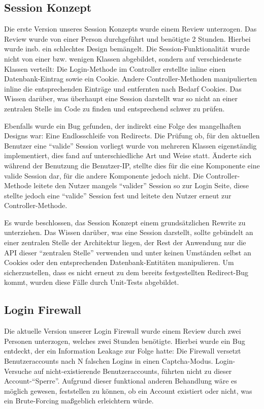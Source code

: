 \documentclass[12pt,DIV14,BCOR10mm,a4paper,twoside,parskip=half-,headsepline,headinclude,english,ngerman,bibliography=totocnumbered]{scrreprt}
\begin{document}
\subsection{Session Konzept}
Die erste Version unseres Session Konzepts wurde einem Review unterzogen. Das Review wurde von einer Person durchgeführt und benötigte 2 Stunden. Hierbei wurde insb. ein schlechtes Design bemängelt. Die Session-Funktionalität wurde nicht von einer bzw. wenigen Klassen abgebildet, sondern auf verschiedenste Klassen verteilt: Die Login-Methode im Controller erstellte inline einen Datenbank-Eintrag sowie ein Cookie. Andere Controller-Methoden manipulierten inline die entsprechenden Einträge und entfernten nach Bedarf Cookies. Das Wissen darüber, was überhaupt eine Session darstellt war so nicht an einer zentralen Stelle im Code zu finden und entsprechend schwer zu prüfen.

Ebenfalls wurde ein Bug gefunden, der indirekt eine Folge des mangelhaften Designs war: Eine Endlosschleife von Redirects. Die Prüfung ob, für den aktuellen Benutzer eine ``valide'' Session vorliegt wurde von mehreren Klassen eigenständig implementiert, dies fand auf unterschiedliche Art und Weise statt. Änderte sich während der Benutzung die Benutzer-IP, stellte dies für die eine Komponente eine valide Session dar, für die andere Komponente jedoch nicht. Die Controller-Methode leitete den Nutzer mangels ``valider'' Session so zur Login Seite, diese stellte jedoch eine ``valide'' Session fest und leitete den Nutzer erneut zur Controller-Methode.

Es wurde beschlossen, das Session Konzept einem grundsätzlichen Rewrite zu unterziehen. Das Wissen darüber, was eine Session darstellt, sollte gebündelt an einer zentralen Stelle der Architektur liegen, der Rest der Anwendung nur die API dieser ``zentralen Stelle'' verwenden und unter keinen Umständen selbst an Cookies oder den entsprechenden Datenbank-Entitäten manipulieren. Um sicherzustellen, dass es nicht erneut zu dem bereits festgestellten Redirect-Bug kommt, wurden diese Fälle durch Unit-Tests abgebildet.

\subsection{Login Firewall}
Die aktuelle Version unserer Login Firewall wurde einem Review durch zwei Personen unterzogen, welches zwei Stunden benötigte. Hierbei wurde ein Bug entdeckt, der ein Information Leakage zur Folge hatte: Die Firewall versetzt Benutzeraccounts nach N falschen Logins in einen Captcha-Modus. Login-Versuche auf nicht-existierende Benutzeraccounts, führten nicht zu dieser Account-``Sperre''. Aufgrund dieser funktional anderen Behandlung wäre es möglich gewesen, feststellen zu können, ob ein Account existiert oder nicht, was ein Brute-Forcing maßgeblich erleichtern würde.
\end{document}
